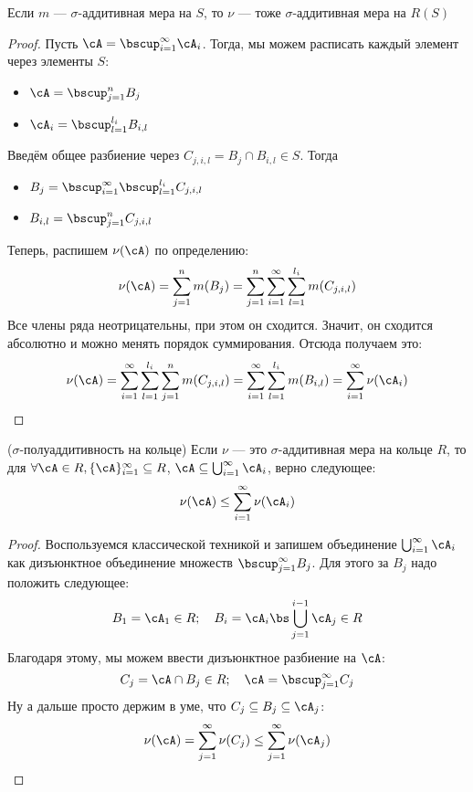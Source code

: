 \begin{theorem}
	Если $m$ --- $\sigma$-аддитивная мера на $S$, то $\nu$ --- тоже $\sigma$-аддитивная мера на $R(S)$
\end{theorem}

\begin{proof}
	Пусть $\cA = \bscup_{i = 1}^\infty \cA_i$. Тогда, мы можем расписать каждый элемент через элементы $S$:
	\begin{itemize}
		\item \(\cA = \bscup_{j = 1}^n B_j\)
		
		\item \(\cA_i = \bscup_{l = 1}^{l_i} B_{i, l}\)
	\end{itemize}
	Введём общее разбиение через $C_{j, i, l} = B_j \cap B_{i, l} \in S$. Тогда
	\begin{itemize}
		\item \(B_j = \bscup_{i = 1}^\infty \bscup_{l = 1}^{l_i} C_{j, i, l}\)
		
		\item \(B_{i, l} = \bscup_{j = 1}^n C_{j, i, l}\)
	\end{itemize}
	Теперь, распишем $\nu(\cA)$ по определению:
	\[
		\nu(\cA) = \sum_{j = 1}^n m(B_j) = \sum_{j = 1}^n \sum_{i = 1}^\infty \sum_{l = 1}^{l_i} m(C_{j, i, l})
	\]
	Все члены ряда неотрицательны, при этом он сходится. Значит, он сходится абсолютно и можно менять порядок суммирования. Отсюда получаем это:
	\[
		\nu(\cA) = \sum_{i = 1}^\infty \sum_{l = 1}^{l_i} \sum_{j = 1}^n m(C_{j, i, l}) = \sum_{i = 1}^\infty \sum_{l = 1}^{l_i} m(B_{i, l}) = \sum_{i = 1}^\infty \nu(\cA_i)
	\]
\end{proof}

\begin{theorem}
	($\sigma$-полуаддитивность на кольце) Если $\nu$ --- это $\sigma$-аддитивная мера на кольце $R$, то для $\forall \cA \in R, \{\cA\}_{i = 1}^\infty \subseteq R$, $\cA \subseteq \bigcup_{i = 1}^\infty \cA_i$, верно следующее:
	\[
		\nu(\cA) \le \sum_{i = 1}^\infty \nu(\cA_i)
	\]
\end{theorem}

\begin{proof}
	Воспользуемся классической техникой и запишем объединение $\bigcup_{i = 1}^\infty \cA_i$ как дизъюнктное объединение множеств $\bscup_{j = 1}^\infty B_j$. Для этого за $B_j$ надо положить следующее:
	\[
		B_1 = \cA_1 \in R; \quad B_i = \cA_i \bs \bigcup_{j = 1}^{i - 1} \cA_j \in R
	\]
	Благодаря этому, мы можем ввести дизъюнктное разбиение на $\cA$:
	\[
		C_j = \cA \cap B_j \in R; \quad \cA = \bscup_{j = 1}^\infty C_j
	\]
	Ну а дальше просто держим в уме, что $C_j \subseteq B_j \subseteq \cA_j$:
	\[
		\nu(\cA) = \sum_{j = 1}^\infty \nu(C_j) \le \sum_{j = 1}^\infty \nu(\cA_j)
	\]
\end{proof}


